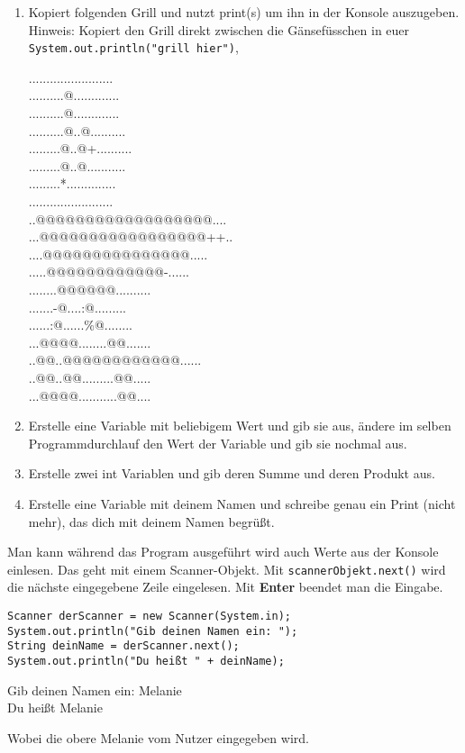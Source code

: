 \documentclass{../../sheet}
\begin{document}
\begin{enumerate}
    \item Kopiert folgenden Grill und nutzt print(s) um ihn in der Konsole auszugeben.\\
    Hinweis: Kopiert den Grill direkt zwischen die Gänsefüsschen in euer \\\texttt{System.out.println("grill hier")},  
          \begin{ausgabe}
........................\\
..........@.............\\
..........@.............\\
..........@..@..........\\
.........@..@+..........\\
.........@..@...........\\
.........*..............\\
........................\\
..@@@@@@@@@@@@@@@@@@....\\
...@@@@@@@@@@@@@@@@@++..\\
....@@@@@@@@@@@@@@@.....\\
.....@@@@@@@@@@@@-......\\
........@@@@@@..........\\
.......-@....:@.........\\
......:@......\%@........\\
...@@@@........@@.......\\
..@@..@@@@@@@@@@@@......\\
..@@..@@.........@@.....\\
...@@@@...........@@....
          \end{ausgabe}
    \item Erstelle eine Variable mit beliebigem Wert und gib sie aus, ändere im selben Programmdurchlauf den Wert der Variable und gib sie nochmal aus.
    \item Erstelle zwei int Variablen und gib deren Summe und deren Produkt aus.
    \item Erstelle eine Variable mit deinem Namen und schreibe genau ein Print (nicht mehr), das dich mit deinem Namen begrüßt.
\end{enumerate}

\newpage
{}
Man kann während das Program ausgeführt wird auch Werte aus der Konsole einlesen. Das geht mit einem Scanner-Objekt. Mit \texttt{scannerObjekt.next()} wird die nächste eingegebene Zeile eingelesen. Mit \textbf{Enter} beendet man die Eingabe.
\begin{verbatim}
Scanner derScanner = new Scanner(System.in);
System.out.println("Gib deinen Namen ein: ");
String deinName = derScanner.next();
System.out.println("Du heißt " + deinName);
\end{verbatim}
\begin{ausgabe}
Gib deinen Namen ein: Melanie\\
Du heißt Melanie
\end{ausgabe}
Wobei die obere Melanie vom Nutzer eingegeben wird.
\end{document}
